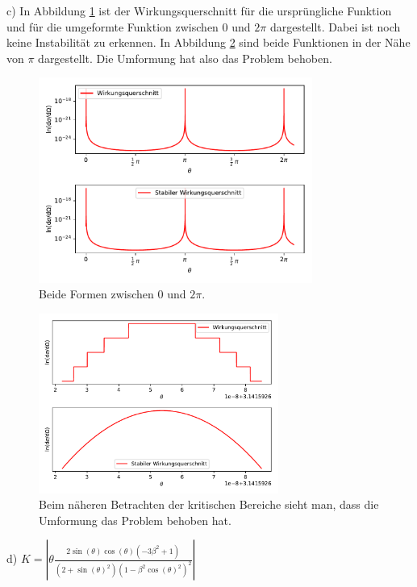 \documentclass[
  bibliography=totoc,     %
  captions=tableheading,  %
  titlepage=firstiscover, %
]{scrartcl}
\begin{document}
\noindent
c) In Abbildung \ref{fig:4} ist der Wirkungsquerschnitt für die ursprüngliche Funktion
und für die umgeformte Funktion zwischen $0$ und $2\pi$ dargestellt.
Dabei ist noch keine Instabilität zu erkennen. In Abbildung \ref{fig:5}
sind beide Funktionen in der Nähe von $\pi$ dargestellt. Die Umformung hat also
das Problem behoben.
\begin{figure}[H]
  \centering
  \includegraphics[width=0.8\textwidth]{wirkungsquerschnitt1.pdf}
  \caption{Beide Formen zwischen $0$ und $2 \pi$.}
  \label{fig:4}
\end{figure}
\begin{figure}[H]
  \centering
  \includegraphics[width=0.7\textwidth]{wirkungsquerschnitt2.pdf}
  \caption{Beim näheren Betrachten der kritischen Bereiche sieht man, dass die Umformung das Problem behoben hat.}
  \label{fig:5}
\end{figure}

\noindent
d) $K = |\theta  \frac{2 \sin(\theta)\cos(\theta)(-3\beta^2+1)}{(2+\sin(\theta)^2)(1 - \beta^2  \cos(\theta)^2)^2}|$\\
\end{document}
